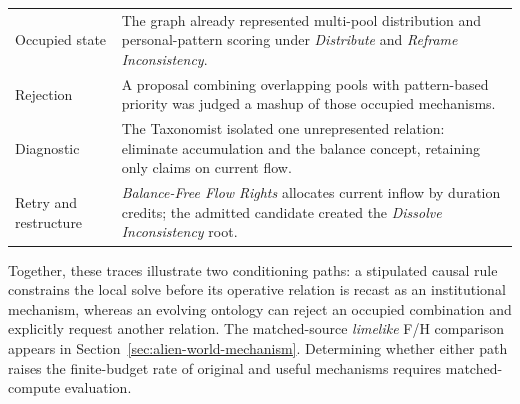 \documentclass[11pt,a4paper]{article}
\begin{document}
\begin{center}
\footnotesize
\begin{tabularx}{\textwidth}{>{\raggedright\arraybackslash}p{28mm}X}
\toprule
Occupied state & The graph already represented multi-pool distribution and personal-pattern scoring under \emph{Distribute} and \emph{Reframe Inconsistency}. \\
Rejection & A proposal combining overlapping pools with pattern-based priority was judged a mashup of those occupied mechanisms. \\
Diagnostic & The Taxonomist isolated one unrepresented relation: eliminate accumulation and the balance concept, retaining only claims on current flow. \\
Retry and restructure & \emph{Balance-Free Flow Rights} allocates current inflow by duration credits; the admitted candidate created the \emph{Dissolve Inconsistency} root. \\
\bottomrule
\end{tabularx}
\end{center}

Together, these traces illustrate two conditioning paths: a stipulated causal rule constrains the local solve before its operative relation is recast as an institutional mechanism, whereas an evolving ontology can reject an occupied combination and explicitly request another relation. The matched-source \emph{limelike} F/H comparison appears in Section~\ref{sec:alien-world-mechanism}. Determining whether either path raises the finite-budget rate of original and useful mechanisms requires matched-compute evaluation.
\end{document}
